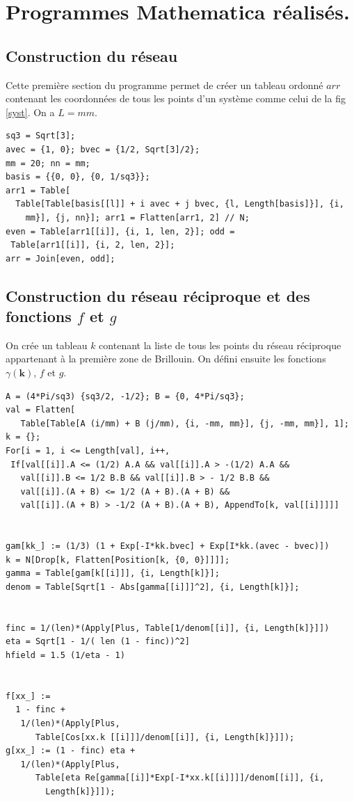 \documentclass[a4paper, french]{report}
\newcommand{\ond}{\ensuremath{\mathbf{k}\xspace}}
\newcommand{\gam}{\gamma(\ond{})}
\newcommand{\1}{\ensuremath{\ket{\om_1\bom_1}}\xspace}
\newcommand{\2}{\ensuremath{\ket{\om_2\bom_2}}\xspace}
\begin{document}
\chapter{Programmes Mathematica réalisés.}
\section{Construction du réseau}

Cette première section du programme permet de créer un tableau ordonné $arr$ contenant les coordonnées de tous les points d'un système comme celui de la fig \ref{syst}. On a $L=mm$.
\begin{lstlisting}
sq3 = Sqrt[3];
avec = {1, 0}; bvec = {1/2, Sqrt[3]/2};
mm = 20; nn = mm;
basis = {{0, 0}, {0, 1/sq3}};
arr1 = Table[
  Table[Table[basis[[l]] + i avec + j bvec, {l, Length[basis]}], {i, 
    mm}], {j, nn}]; arr1 = Flatten[arr1, 2] // N;
even = Table[arr1[[i]], {i, 1, len, 2}]; odd = 
 Table[arr1[[i]], {i, 2, len, 2}];
arr = Join[even, odd];
\end{lstlisting}

\section{Construction du réseau réciproque et des fonctions $f$ et $g$}

On crée un tableau $k$ contenant la liste de tous les points du réseau réciproque appartenant à la première zone de Brillouin. On défini ensuite les fonctions $\gam$, $f$ et $g$.
\begin{lstlisting}
A = (4*Pi/sq3) {sq3/2, -1/2}; B = {0, 4*Pi/sq3};
val = Flatten[
   Table[Table[A (i/mm) + B (j/mm), {i, -mm, mm}], {j, -mm, mm}], 1];
k = {};
For[i = 1, i <= Length[val], i++, 
 If[val[[i]].A <= (1/2) A.A && val[[i]].A > -(1/2) A.A && 
   val[[i]].B <= 1/2 B.B && val[[i]].B > - 1/2 B.B && 
   val[[i]].(A + B) <= 1/2 (A + B).(A + B) && 
   val[[i]].(A + B) > -1/2 (A + B).(A + B), AppendTo[k, val[[i]]]]]
   
   
gam[kk_] := (1/3) (1 + Exp[-I*kk.bvec] + Exp[I*kk.(avec - bvec)])
k = N[Drop[k, Flatten[Position[k, {0, 0}]]]];
gamma = Table[gam[k[[i]]], {i, Length[k]}];
denom = Table[Sqrt[1 - Abs[gamma[[i]]]^2], {i, Length[k]}];


finc = 1/(len)*(Apply[Plus, Table[1/denom[[i]], {i, Length[k]}]])
eta = Sqrt[1 - 1/( len (1 - finc))^2]
hfield = 1.5 (1/eta - 1)


f[xx_] := 
  1 - finc + 
   1/(len)*(Apply[Plus, 
      Table[Cos[xx.k [[i]]]/denom[[i]], {i, Length[k]}]]);
g[xx_] := (1 - finc) eta + 
   1/(len)*(Apply[Plus, 
      Table[eta Re[gamma[[i]]*Exp[-I*xx.k[[i]]]]/denom[[i]], {i, 
        Length[k]}]]);
\end{lstlisting}
\end{document}
